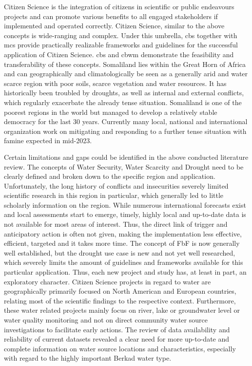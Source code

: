 Citizen Science is the integration of citizens in scientific or public endeavours projects and can promote various benefits to all engaged stakeholders if implemented and operated correctly. Citizen Science, similar to the above concepts is wide-ranging and complex. Under this umbrella, \acrlong*{cbs} together with \acrlong*{mcs} provide practically realizable frameworks and guidelines for the successful application of Citizen Science. \acrlong*{cbs} and \acrlong{cbwm} demonstrate the feasibility and transferability of these concepts.
Somaliland lies within the Great Horn of Africa and can geographically and climatologically be seen as a generally arid and water scarce region with poor soils, scarce vegetation and water resources. It has historically been troubled by droughts, as well as internal and external conflicts, which regularly exacerbate the already tense situation. Somaliland is one of the poorest regions in the world but managed to develop a relatively stable democracy for the last 30 years. Currently many local, national and international organization work on mitigating and responding to a further tense situation with famine expected in mid-2023. 

Certain limitations and gaps could be identified in the above conducted literature review. The concepts of Water Security, Water Scarcity and Drought need to be clearly defined and broken down to the specific region and application. Unfortunately, the long history of conflicts and insecurities severely limited scientific research in this region in particular, which generally led to little scholarly information on the region.
While numerous international forecasts exist and local assessments start to emerge, timely, highly local and up-to-date data is not available for most areas of interest. Thus, the direct link of trigger and anticipatory action is often not given, making the implementation less effective, efficient, targeted and it takes more time. 
The concept of FbF is now generally well established, but the drought use case is new and not yet well researched, which severely limits the amount of guidelines and frameworks available for this particular application. Thus, each new project and study has, at least in part, an exploratory character.
Citizen Science projects in regard to water are geographically primarily focused on North American and European countries, relating most of the scientific findings to the respective context. Furthermore, these water related projects mainly focus on river, lake or groundwater level or water quality monitoring and not on direct community water source investigations to facilitate early actions. The review of data availability and reliability of current datasets revealed a clear need for more up-to-date and complete information on water source locations and characteristics, especially with regard to the highly important Berkad water type. 


